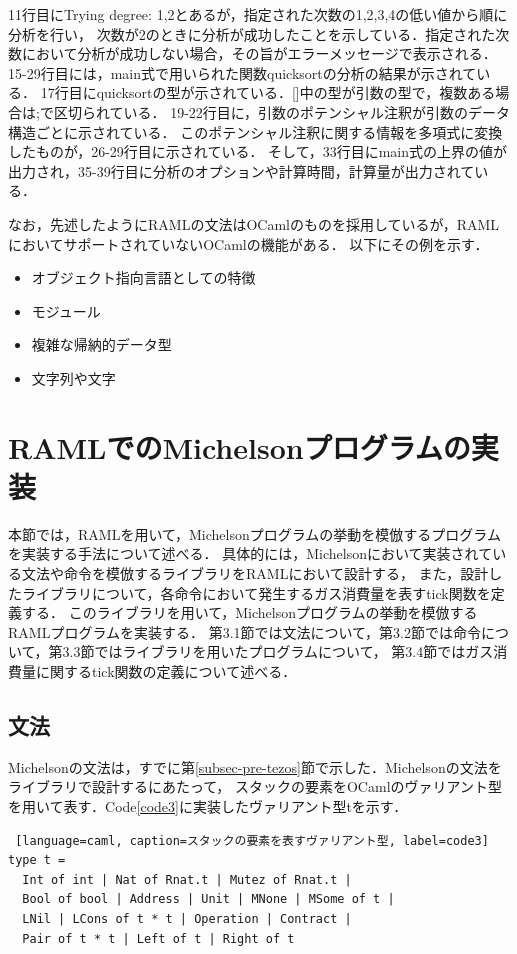 \documentclass{kuisthesis}
\begin{document}
11行目にTrying degree: 1,2とあるが，指定された次数の1,2,3,4の低い値から順に分析を行い，
次数が2のときに分析が成功したことを示している．指定された次数において分析が成功しない場合，その旨がエラーメッセージで表示される．
15-29行目には，main式で用いられた関数quicksortの分析の結果が示されている．
17行目にquicksortの型が示されている．[]中の型が引数の型で，複数ある場合は;で区切られている．
19-22行目に，引数のポテンシャル注釈が引数のデータ構造ごとに示されている．
このポテンシャル注釈に関する情報を多項式に変換したものが，26-29行目に示されている．
そして，33行目にmain式の上界の値が出力され，35-39行目に分析のオプションや計算時間，計算量が出力されている．

なお，先述したようにRAMLの文法はOCamlのものを採用しているが，RAMLにおいてサポートされていないOCamlの機能がある．
以下にその例を示す．
\begin{itemize}
  \item オブジェクト指向言語としての特徴
  \item モジュール
  \item 複雑な帰納的データ型
  \item 文字列や文字
\end{itemize}


\section{RAMLでのMichelsonプログラムの実装} \label{sec-program}
本節では，RAMLを用いて，Michelsonプログラムの挙動を模倣するプログラムを実装する手法について述べる．
具体的には，Michelsonにおいて実装されている文法や命令を模倣するライブラリをRAMLにおいて設計する，
また，設計したライブラリについて，各命令において発生するガス消費量を表すtick関数を定義する．
このライブラリを用いて，Michelsonプログラムの挙動を模倣するRAMLプログラムを実装する．
第3.1節では文法について，第3.2節では命令について，第3.3節ではライブラリを用いたプログラムについて，
第3.4節ではガス消費量に関するtick関数の定義について述べる．

\subsection{文法} \label{subsec-pro-grammar}
Michelsonの文法は，すでに第\ref{subsec-pre-tezos}節で示した．Michelsonの文法をライブラリで設計するにあたって，
スタックの要素をOCamlのヴァリアント型を用いて表す．Code\ref{code3}に実装したヴァリアント型tを示す．
\\

\begin{lstlisting} [language=caml, caption=スタックの要素を表すヴァリアント型, label=code3]
type t =
  Int of int | Nat of Rnat.t | Mutez of Rnat.t |
  Bool of bool | Address | Unit | MNone | MSome of t |
  LNil | LCons of t * t | Operation | Contract |
  Pair of t * t | Left of t | Right of t 
\end{lstlisting}
\end{document}
